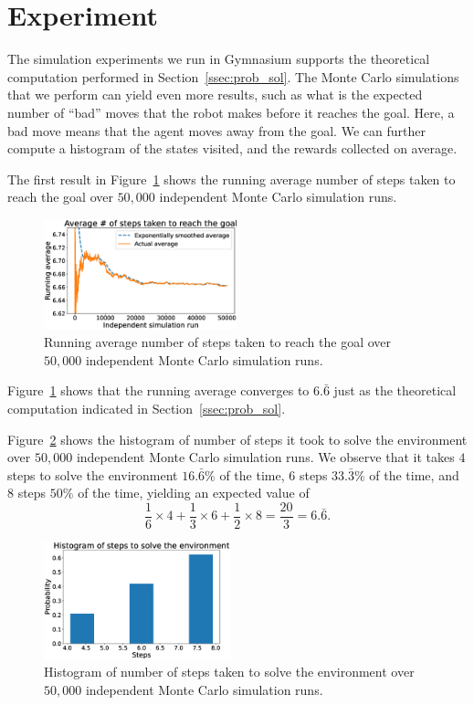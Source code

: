 \section{Experiment}
\label{sec:experiment}
%
The simulation experiments we run in Gymnasium supports the theoretical
computation performed in Section~\ref{ssec:prob_sol}. The Monte Carlo
simulations that we perform can yield even more results, such as what is the 
expected number of ``bad'' moves that the robot makes before it reaches the goal. Here, a bad move means that the agent moves away from the goal. We can 
further compute a histogram of the states visited, and the rewards collected on 
average.

The first result in Figure~\ref{fig:running_avg} shows the running average
number of steps taken to reach the goal over $50,000$ independent Monte Carlo
simulation runs.
%
\begin{figure}[t]
    \centering
    \includegraphics[width=0.5\textwidth]{./figures/running_avg.eps}
    \caption{Running average number of steps taken to reach the goal over $50,000$ independent Monte Carlo simulation runs.}
    \label{fig:running_avg}
\end{figure}
%
Figure~\ref{fig:running_avg} shows that the running average converges to $6.\bar{6}$ just as the theoretical computation indicated in Section~\ref{ssec:prob_sol}.

Figure~\ref{fig:histogram} shows the histogram of number of steps it took to 
solve the environment over $50,000$ independent Monte Carlo simulation runs. We 
observe that it takes $4$ steps to solve the environment $16.\bar{6}\%$ of the time, $6$ steps $33.\bar{3}\%$ of the time, and $8$ steps $50\%$ of the time, yielding an expected value of 
%
\[
\frac{1}{6} \times 4 + \frac{1}{3} \times 6 + \frac{1}{2} \times 8 = \frac{20}{3} = 6.\bar{6}.
\]
%
\begin{figure}[tbh]
    \centering
    \includegraphics[width=0.48\textwidth]{./figures/steps_histogram.eps}
    \caption{Histogram of number of steps taken to solve the environment over $50,000$ independent Monte Carlo simulation runs.}
    \label{fig:histogram}
\end{figure}

